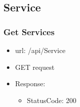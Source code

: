 \documentclass[11pt]{article}
\begin{document}
\subsection{Service}
\label{sec:org8ad43d0}
\subsubsection{Get Services}
\label{sec:org319163c}
\begin{itemize}
\item url: /api/Service
\item GET request
\item Response:
\begin{itemize}
\item StatusCode: 200
\end{itemize}
\end{itemize}
\end{document}
